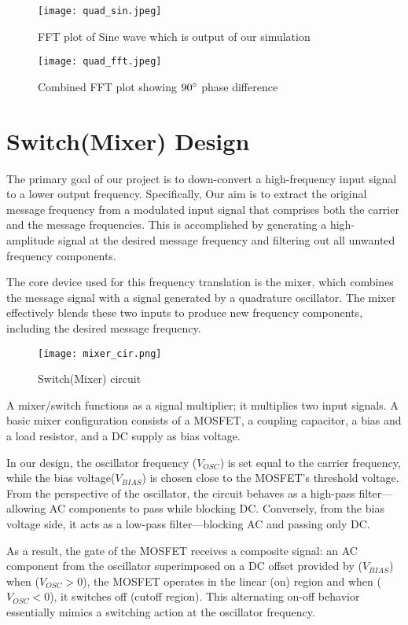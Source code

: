 \documentclass[conference]{IEEEtran}
\begin{document}
\begin{figure}[H]
\centering
\texttt{[image: quad\_sin.jpeg]}
\caption{ FFT plot of Sine wave which is output of our simulation}
\end{figure}

\begin{figure}[H]
\centering
\texttt{[image: quad\_fft.jpeg]}
\caption{ Combined FFT plot showing $90\degree$ phase difference}
\end{figure}

\section{Switch(Mixer) Design}
The primary goal of our project is to down-convert a high-frequency input signal to a lower output frequency. Specifically, Our aim is to extract the original message frequency from a modulated input signal that comprises both the carrier and the message frequencies. This is accomplished by generating a high-amplitude signal at the desired message frequency and filtering out all unwanted frequency components.

The core device used for this frequency translation is the mixer, which combines the message signal with a signal generated by a quadrature oscillator. The mixer effectively blends these two inputs to produce new frequency components, including the desired message frequency.

\begin{figure}[H]
\centering
\texttt{[image: mixer\_cir.png]}
\caption{Switch(Mixer) circuit}
\end{figure}

A mixer/switch functions as a signal multiplier; it multiplies two input signals. A basic mixer configuration consists of a MOSFET, a coupling capacitor, a bias and a load resistor, and a DC supply as bias voltage.

In our design, the oscillator frequency ($V_{OSC}$) is set equal to the carrier frequency, while the bias voltage($V_{BIAS}$)  is chosen close to the MOSFET’s threshold voltage. From the perspective of the oscillator, the circuit behaves as a high-pass filter—allowing AC components to pass while blocking DC. Conversely, from the bias voltage side, it acts as a low-pass filter—blocking AC and passing only DC.

As a result, the gate of the MOSFET receives a composite signal: an AC component from the oscillator superimposed on a DC offset provided by ($V_{BIAS}$) when ($V_{OSC}>0$), the MOSFET operates in the linear (on)  region and when ($V_{OSC}<0$), it switches off (cutoff region). This alternating on-off behavior essentially mimics a switching action at the oscillator frequency.
\end{document}
